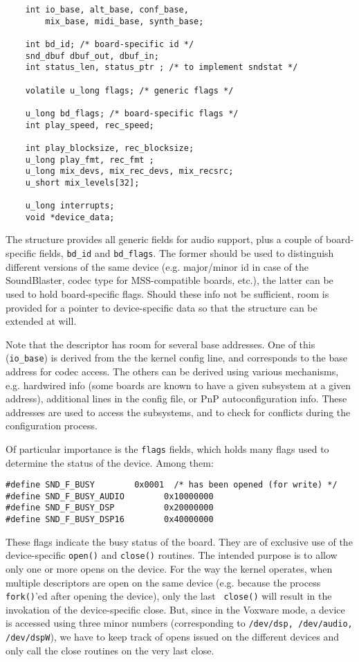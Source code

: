 \documentclass[11pt]{article}
\begin{document}
\begin{verbatim}
    int io_base, alt_base, conf_base,
        mix_base, midi_base, synth_base;

    int bd_id; /* board-specific id */
    snd_dbuf dbuf_out, dbuf_in;
    int status_len, status_ptr ; /* to implement sndstat */

    volatile u_long flags; /* generic flags */

    u_long bd_flags; /* board-specific flags */
    int play_speed, rec_speed;

    int play_blocksize, rec_blocksize;
    u_long play_fmt, rec_fmt ;
    u_long mix_devs, mix_rec_devs, mix_recsrc;
    u_short mix_levels[32];

    u_long interrupts;
    void *device_data;
\end{verbatim}
The structure provides all generic fields for audio support, plus a
couple of board-specific fields, {\tt bd\_id} and {\tt bd\_flags}. The
former should be used to distinguish different versions of the same
device (e.g. major/minor id in case of the SoundBlaster, codec type
for MSS-compatible boards, etc.), the latter can be used to hold
board-specific flags. Should these info not be sufficient, room is
provided for a pointer to device-specific data so that the structure
can be extended at will.

Note that the descriptor has room for several base addresses. One of
this ({\tt io\_base}) is derived from the the kernel config line, and
corresponds to the base address for codec access. The others can be
derived using various mechanisms, e.g. hardwired info (some boards are
known to have a given subsystem at a given address), additional lines
in the config file, or PnP autoconfiguration info. These addresses are
used to access the subsystems, and to check for conflicts during the
configuration process.

Of particular importance is the {\tt flags} fields, which holds many
flags used to determine the status of the device. Among them:
\begin{verbatim}
#define SND_F_BUSY        0x0001  /* has been opened (for write) */
#define SND_F_BUSY_AUDIO        0x10000000
#define SND_F_BUSY_DSP          0x20000000 
#define SND_F_BUSY_DSP16        0x40000000
\end{verbatim}
These flags indicate the busy status of the board. They are of
exclusive use of the device-specific {\tt open()} and {\tt close()}
routines. The intended purpose is to allow only one or more opens
on the device. For the way the kernel operates, when multiple
descriptors are open on the same device (e.g. because the process
{\tt fork()}'ed after opening the device), only the last {\tt
close()} will result in the invokation of the device-specific close.
But, since in the Voxware mode, a device is accessed using three
minor numbers (corresponding to {\tt /dev/dsp, /dev/audio, /dev/dspW}),
we have to keep track of opens issued on the different devices and
only call the close routines on the very last close.
\end{document}
